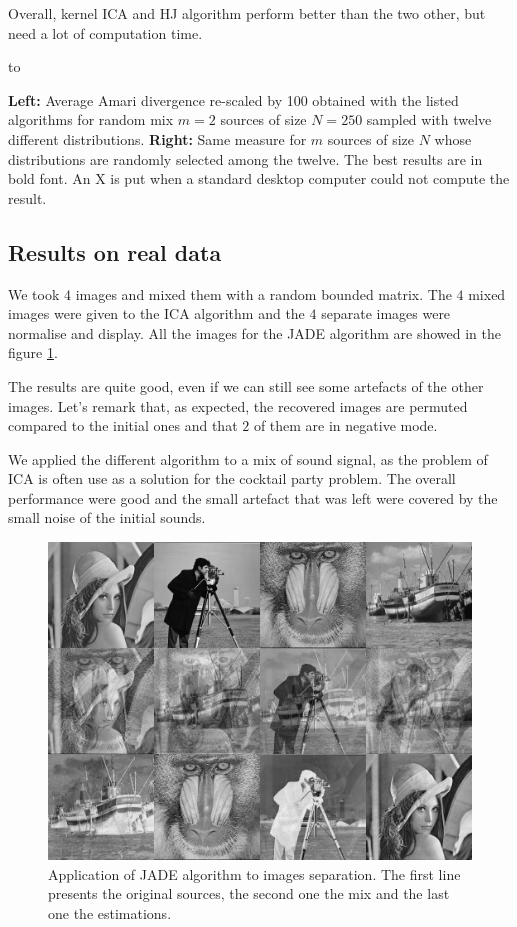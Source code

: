 \documentclass[a4paper]{article}
\begin{document}
Overall, kernel ICA and HJ algorithm perform better than the two other, but
need a lot of computation time.

\begin{table}
\centering
\hbox to \textwidth{\hspace{-.5cm}
\resizebox{.45\textwidth}{2cm}{}\hss
\resizebox{.55\textwidth}{2cm}{}
}
\caption{\textbf{Left:} Average Amari divergence re-scaled by 100 obtained with the listed algorithms for random mix $m=2$ sources of size $N=250$ sampled with twelve different distributions. \textbf{Right:} Same measure for $m$ sources of size $N$ whose distributions are randomly selected among the twelve. The best results are in bold font. An X is put when a standard desktop computer could not compute the result.\label{tab:resultats}}
\end{table}

\subsection{Results on real data}

We took $4$ images and mixed them with a random bounded matrix.
The $4$ mixed images were given to the ICA algorithm and the $4$ separate images were normalise and display.
All the images for the JADE algorithm are showed in the figure \ref{fig:res_images}.

The results are quite good, even if we can still see some artefacts of the other images. Let's remark that, as expected, the recovered images are permuted compared to the initial ones and that $2$ of them are in negative mode.

\znl

We applied the different algorithm to a mix of sound signal, as the problem of ICA is often use as a solution for the cocktail party problem. The overall performance were good and the small artefact that was left were covered by the small noise of the initial sounds.



\begin{figure}
\centering
\includegraphics[width=.74\textwidth]{../image_test/unmix4.png}
\caption{Application of JADE algorithm to images separation. The first line presents the original sources, the second one the mix and the last one the estimations.\label{fig:res_images}}
\end{figure}
\end{document}
